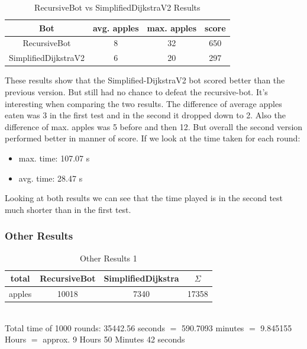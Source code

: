 \documentclass[a4paper,12pt]{article}
\begin{document}
\begin{table}[ht]
\caption{RecursiveBot vs SimplifiedDijkstraV2 Results} %
\centering %
\begin{tabular}{c c c c } %
\hline\hline %
Bot & avg. apples & max. apples & score\\ [0.5ex] %
\hline %
RecursiveBot & 8 & 32 & 650 \\ %
SimplifiedDijkstraV2 & 6 & 20 & 297 \\
[1ex] %
\hline %
\end{tabular}
\label{table:recvsdijkstra2} %
\end{table}
These results show that the Simplified-DijkstraV2 bot scored better than the previous version. But still had no chance to defeat the recursive-bot. It's interesting when comparing the two results. The difference of average apples eaten was 3 in the first test and in the second it dropped down to 2. Also the difference of max. apples was 5 before and then 12. But overall the second version performed better in manner of score.
If we look at the time taken for each round:\\
\begin{itemize}
	\item max. time: 107.07 s
	\item avg. time:  28.47 s
\end{itemize}
Looking at both results we can see that the time played is in the second test much shorter than in the first test.
\newpage
\subsubsection{Other Results}
\begin{table}[H]
\caption{Other Results 1} %
\centering %
\begin{tabular}{c c c c } %
\hline\hline %
total & RecursiveBot & SimplifiedDijkstra & $\Sigma$ \\ [0.5ex] %
\hline %
apples & 10018 & 7340 & 17358 \\ %
[1ex] %
\hline %
\end{tabular}
\label{table:otherresults1} %
\\Total time of 1000 rounds: 35442.56 seconds $=$ 590.7093 minutes $=$ 9.845155 Hours $=$ approx. 9 Hours 50 Minutes 42 seconds
\end{table}
\end{document}
